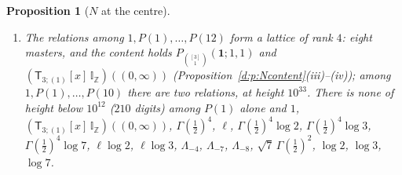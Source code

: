 \documentclass[11pt]{article}
\newcommand{\one}{\mathbf 1}
\newcommand{\sT}{\mathsf T}
\newcommand{\IZ}{\mathbb I_{\mathbb Z}}
\newcommand{\Tx}[3]{(\sT_{#1;(1)}[x]\,#2)((#3,\infty))}
\newcommand{\Pth}{P_{\binom{[3]}1}(\one;1,1)}
\theoremstyle{plain}
\newtheorem{proposition}{Proposition}[section]
\theoremstyle{definition}
\theoremstyle{remark}
\begin{document}
\begin{proposition}[$N$ at the centre]
\begin{enumerate}[label=(\roman*)]
\[
P(1)=4.57891247888240480638020373022855744921869580872760320929687575\ldots,
\]
$P(1)/\mathrm{Cor}=0.07268$. Check: tropical sampling gives $4.574\pm0.008$.
\item The relations among $1,P(1),\dots,P(12)$ form a lattice of rank $4$: eight masters, and the content holds $\Pth$ and $\Tx3{\IZ}0$ (Proposition~\ref{d:p:Ncontent}(iii)--(iv)); among $1,P(1),\dots,P(10)$ there are two relations, at height $10^{33}$. There is none of height below $10^{12}$ ($210$ digits) among $P(1)$ alone and $1$, $\Tx3{\IZ}0$, $\Gamma(\frac12)^4$, $\ell$, $\Gamma(\frac12)^4\log2$, $\Gamma(\frac12)^4\log3$, $\Gamma(\frac12)^4\log7$, $\ell\log2$, $\ell\log3$, $\Lambda_{-4}$, $\Lambda_{-7}$, $\Lambda_{-8}$, $\sqrt7\,\Gamma(\frac12)^2$, $\log2$, $\log3$, $\log7$.
\end{enumerate}
\end{proposition}
\end{document}
